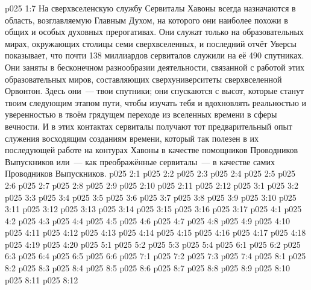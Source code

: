 \vs p025 1:7 На сверхвселенскую службу Сервиталы Хавоны всегда назначаются в область, возглавляемую Главным Духом, на которого они наиболее похожи в общих и особых духовных прерогативах. Они служат только на образовательных мирах, окружающих столицы семи сверхвселенных, и последний отчёт Уверсы показывает, что почти 138 миллиардов сервиталов служили на её 490 спутниках. Они заняты в бесконечном разнообразии деятельности, связанной с работой этих образовательных миров, составляющих сверхуниверситеты сверхвселенной Орвонтон. Здесь они~--- твои спутники; они спускаются с высот, которые станут твоим следующим этапом пути, чтобы изучать тебя и вдохновлять реальностью и уверенностью в твоём грядущем переходе из вселенных времени в сферы вечности. И в этих контактах сервиталы получают тот предварительный опыт служения восходящим созданиям времени, который так полезен в их последующей работе на контурах Хавоны в качестве помощников Проводников Выпускников или~--- как преображённые сервиталы~--- в качестве самих Проводников Выпускников.
\vs p025 2:1 
\vs p025 2:2 
\vs p025 2:3 
\vs p025 2:4 
\vs p025 2:5 \pc 
\vs p025 2:6 
\vs p025 2:7 
\vs p025 2:8 
\vs p025 2:9 
\vs p025 2:10 \pc 
\vs p025 2:11 \pc 
\vs p025 2:12 
\vs p025 3:1 
\vs p025 3:2 
\vs p025 3:3 
\vs p025 3:4 
\vs p025 3:5 
\vs p025 3:6 
\vs p025 3:7 
\vs p025 3:8 
\vs p025 3:9 
\vs p025 3:10 
\vs p025 3:11 
\vs p025 3:12 
\vs p025 3:13 
\vs p025 3:14 \pc 
\vs p025 3:15 
\vs p025 3:16 
\vs p025 3:17 
\vs p025 4:1 
\vs p025 4:2 \pc 
\vs p025 4:3 
\vs p025 4:4 
\vs p025 4:5 
\vs p025 4:6 
\vs p025 4:7 
\vs p025 4:8 
\vs p025 4:9 
\vs p025 4:10 \pc 
\vs p025 4:11 
\vs p025 4:12 
\vs p025 4:13 
\vs p025 4:14 \pc 
\vs p025 4:15 
\vs p025 4:16 
\vs p025 4:17 \pc 
\vs p025 4:18 
\vs p025 4:19 
\vs p025 4:20 
\vs p025 5:1 
\vs p025 5:2 
\vs p025 5:3 
\vs p025 5:4 
\vs p025 6:1 
\vs p025 6:2 
\vs p025 6:3 
\vs p025 6:4 
\vs p025 6:5 
\vs p025 6:6 
\vs p025 7:1 
\vs p025 7:2 
\vs p025 7:3 
\vs p025 7:4 
\vs p025 8:1 
\vs p025 8:2 
\vs p025 8:3 
\vs p025 8:4 
\vs p025 8:5 \pc 
\vs p025 8:6 
\vs p025 8:7 
\vs p025 8:8 \pc 
\vs p025 8:9 \pc 
\vs p025 8:10 
\vs p025 8:11 
\vsetoff
\vs p025 8:12 
\quizlink
